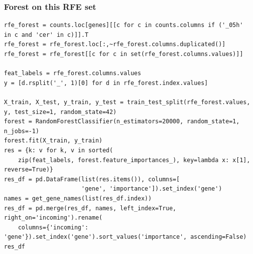\documentclass[11pt]{article}
\begin{document}
\subsubsection{Forest on this RFE set}
\label{sec:org20eabc1}

\begin{verbatim}
rfe_forest = counts.loc[genes][[c for c in counts.columns if ('_05h' in c and 'cer' in c)]].T
rfe_forest = rfe_forest.loc[:,~rfe_forest.columns.duplicated()]
rfe_forest = rfe_forest[[c for c in set(rfe_forest.columns.values)]]

feat_labels = rfe_forest.columns.values
y = [d.rsplit('_', 1)[0] for d in rfe_forest.index.values]

X_train, X_test, y_train, y_test = train_test_split(rfe_forest.values, y, test_size=1, random_state=42)
forest = RandomForestClassifier(n_estimators=20000, random_state=1, n_jobs=-1)
forest.fit(X_train, y_train)
res = {k: v for k, v in sorted(
    zip(feat_labels, forest.feature_importances_), key=lambda x: x[1], reverse=True)}
res_df = pd.DataFrame(list(res.items()), columns=[
                      'gene', 'importance']).set_index('gene')
names = get_gene_names(list(res_df.index))
res_df = pd.merge(res_df, names, left_index=True, right_on='incoming').rename(
    columns={'incoming': 'gene'}).set_index('gene').sort_values('importance', ascending=False)
res_df
\end{verbatim}
\end{document}
